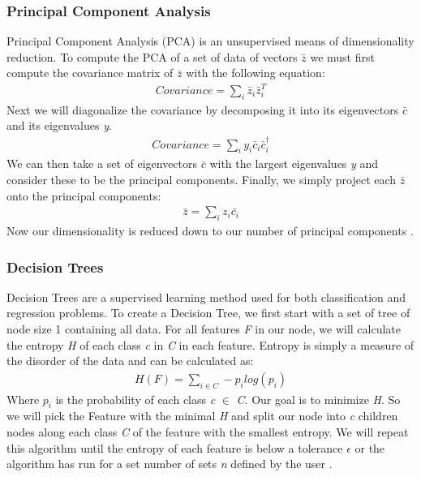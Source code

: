 \documentclass[conference]{IEEEtran}
\begin{document}
\subsubsection{Principal Component Analysis}
Principal Component Analysis (PCA) is an unsupervised means of dimensionality reduction. To compute the PCA of a set of data of vectors $\bar{z}$ we must first compute the covariance matrix of $\bar{z}$ with the following equation:
\begin{align*}
Covariance = \sum_i \bar{z}_i\bar{z}^T_i
\end{align*}
\indent Next we will diagonalize the covariance by decomposing it into its eigenvectors \emph{$\bar{c}$} and its eigenvalues \emph{{y}}.
\begin{align*}
Covariance = \sum_i y_i\bar{c}_i\bar{c}_i^\dagger
\end{align*}
\indent We can then take a set of eigenvectors \emph{$\bar{c}$} with the largest eigenvalues \emph{{y}} and consider these to be the principal components. Finally, we simply project each $\bar{z}$ onto the principal components: 
\begin{align*}
    \bar{z} = \sum_i z_i \bar{c_i}
\end{align*}
Now our dimensionality is reduced down to our number of principal components \cite{b7}. 
\subsubsection{Decision Trees}
Decision Trees are a supervised learning method used for both classification and regression problems. To create a Decision Tree, we first start with a set of tree of node size 1 containing all data. For all features \emph{F} in our node, we will calculate the entropy \emph{H} of each class \emph{c} in \emph{C} in each feature. Entropy is simply a measure of the disorder of the data and can be calculated as:
\begin{align*}
    H(F) = \sum_{i\in C} -p_i log(p_i)
\end{align*}
Where \emph{$p_i$} is the probability of each class \emph{c} $\in$ \emph{C}. Our goal is to minimize \emph{H}. So we will pick the Feature with the minimal \emph{H} and split our node into \emph{c} children nodes along each class \emph{C} of the feature with the smallest entropy. We will repeat this algorithm until the entropy of each feature is below a tolerance $\epsilon$ or the algorithm has run for a set number of sets \emph{n} defined by the user \cite{b11}. 
\end{document}
